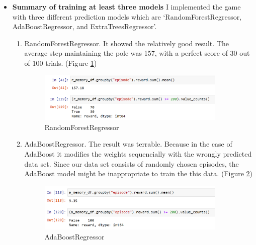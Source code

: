 \documentclass[12pt]{article}
\begin{document}
\begin{itemize}

\item \textbf{Summary of training at least three models} I implemented the game with three different prediction models which are  `RandomForestRegressor, AdaBoostRegressor, and ExtraTreesRegressor'.
    \begin{enumerate}
      \item RandomForestRegressor. It showed the relatively good result. The average step maintaining the pole was 157, with a perfect score of 30 out of 100 trials. (Figure \ref{random_forest})
      \begin{figure}[H]
        \centering
        \includegraphics[width=0.9\textwidth]{figures/random_forest.png}
        \caption{RandomForestRegressor}\label{random_forest}
      \end{figure}

      \item AdaBoostRegressor. The result was terrable. Because in the case of AdaBoost it modifies the weights sequencially with the wrongly predicted data set. Since our data set consists of randomly chosen episodes, the AdaBoost model might be inappropriate to train the this data. (Figure \ref{AdaBoost})
      \begin{figure}[H]
        \centering
        \includegraphics[width=0.9\textwidth]{figures/AdaBoost.png}
        \caption{AdaBoostRegressor}\label{AdaBoost}
      \end{figure}


\end{enumerate}
\end{itemize}
\end{document}
